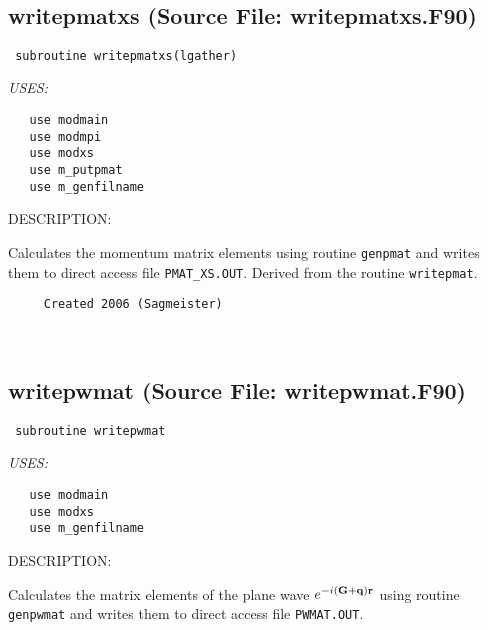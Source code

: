 \documentclass[11pt]{article}
\begin{document}



 
 
\mbox{}\hrulefill\ 
 
\subsection{writepmatxs (Source File: writepmatxs.F90)}


\begin{verbatim} subroutine writepmatxs(lgather)\end{verbatim}{\em USES:}
\begin{verbatim}   use modmain
   use modmpi
   use modxs
   use m_putpmat
   use m_genfilname\end{verbatim}
{\sf DESCRIPTION:\\ }


     Calculates the momentum matrix elements using routine {\tt genpmat} and
     writes them to direct access file {\tt PMAT\_XS.OUT}. Derived from
     the routine {\tt writepmat}.
  
\begin{verbatim}     Created 2006 (Sagmeister)\end{verbatim}


 
 
\mbox{}\hrulefill\ 
 
\subsection{writepwmat (Source File: writepwmat.F90)}


\begin{verbatim} subroutine writepwmat\end{verbatim}{\em USES:}
\begin{verbatim}   use modmain
   use modxs
   use m_genfilname\end{verbatim}
{\sf DESCRIPTION:\\ }


     Calculates the matrix elements of the plane wave
     $e^{-i({\bf G}+{\bf q}){\bf r}}$
     using routine {\tt genpwmat} and writes them to
     direct access file {\tt PWMAT.OUT}.
  
\end{document}
